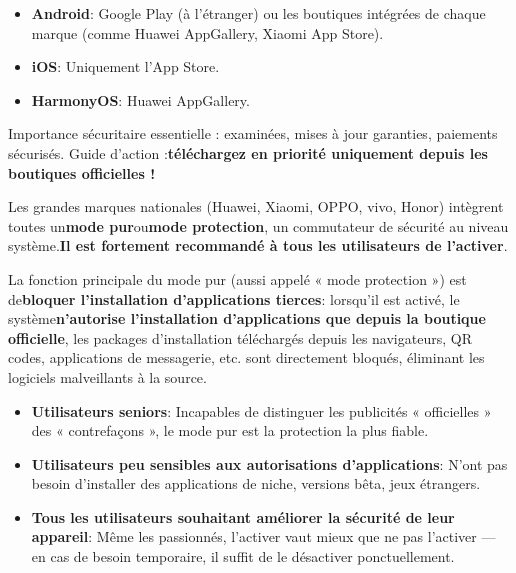 


\begin{itemize}
  \item \textbf{Android}: Google Play (à l'étranger) ou les boutiques intégrées de chaque marque (comme Huawei AppGallery, Xiaomi App Store).
  \item \textbf{iOS}: Uniquement l'App Store.
  \item \textbf{HarmonyOS}: Huawei AppGallery.
\end{itemize}

Importance sécuritaire essentielle : examinées, mises à jour garanties, paiements sécurisés. Guide d'action :\textbf{téléchargez en priorité uniquement depuis les boutiques officielles !}


Les grandes marques nationales (Huawei, Xiaomi, OPPO, vivo, Honor) intègrent toutes un\textbf{mode pur}ou\textbf{mode protection}, un commutateur de sécurité au niveau système.\textbf{Il est fortement recommandé à tous les utilisateurs de l'activer}.


La fonction principale du mode pur (aussi appelé « mode protection ») est de\textbf{bloquer l'installation d'applications tierces}: lorsqu'il est activé, le système\textbf{n'autorise l'installation d'applications que depuis la boutique officielle}, les packages d'installation téléchargés depuis les navigateurs, QR codes, applications de messagerie, etc. sont directement bloqués, éliminant les logiciels malveillants à la source.


\begin{itemize}
  \item \textbf{Utilisateurs seniors}: Incapables de distinguer les publicités « officielles » des « contrefaçons », le mode pur est la protection la plus fiable.
  \item \textbf{Utilisateurs peu sensibles aux autorisations d'applications}: N'ont pas besoin d'installer des applications de niche, versions bêta, jeux étrangers.
  \item \textbf{Tous les utilisateurs souhaitant améliorer la sécurité de leur appareil}: Même les passionnés, l'activer vaut mieux que ne pas l'activer — en cas de besoin temporaire, il suffit de le désactiver ponctuellement.
\end{itemize}

